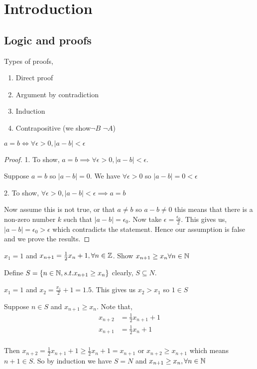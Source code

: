\chapter{Introduction}
\section{Logic and proofs}
Types of proofs,
\begin{enumerate}
    \item Direct proof
    \item Argument by contradiction
    \item Induction
    \item Contrapositive  (we show$\neg B$ \implies $\neg A$)
\end{enumerate}

\begin{theorem}
    $a = b \iff \forall \epsilon > 0, |a - b | < \epsilon$ 
\end{theorem}
\begin{proof}
    1. To show, $a = b \implies \forall \epsilon > 0, |a - b | < \epsilon$.

    Suppose $a = b$ so  $|a - b |= 0$. We have  $\forall \epsilon > 0$ so
    $|a - b | = 0 < \epsilon$
    
    2. To show, $\forall \epsilon > 0, |a - b | < \epsilon \implies a = b$

    Now assume this is not true, or that $a \ne b$ so  $a - b \ne 0$ this means that there is a non-zero number  $k$ such that  $|a - b| = \epsilon_0$. Now take $\epsilon = \frac{\epsilon_0}{2}$. This gives us, 
    $ |a - b | = \epsilon_0 > \epsilon $  which contradicts the statement. Hence our assumption is false and we prove the results.
\end{proof}



\begin{eg}[Induction]
    $x_1 = 1$ and $x_{n + 1} = \frac{1}{2}x_n + 1, \forall n \in \mathbb{Z}$. Show $x_{n + 1} \ge x_n \forall n \in \mathbb{N}$ 


    Define $S = \{n \in \mathbb{N}, s.t. x_{n + 1} \ge x_n\}$ clearly, $S \subseteq N$.


    $x_1 = 1$ and  $x_2 = \frac{x_1}{2} + 1 = 1.5$. This gives us $x_2 > x_1$ so $1 \in S$

    Suppose $n \in S$  and $x_{n + 1} \ge x_n$. Note that,
    \begin{align*}
        x_{n + 2} &= \frac{1}{2}x_{n + 1} + 1\\
        x_{n + 1} &= \frac{1}{2}x_{n} + 1\\
    \end{align*}

    Then $x_{n + 2} = \frac{1}{2}x_{n + 1} + 1 \ge \frac{1}{2} x_n + 1 = x_{n + 1}$ or $x_{n + 2} \ge x_{n + 1}$ which means  $n + 1 \in S$. So by induction we have  $S = N$ and  $x_{n + 1} \ge x_n, \forall n \in \mathbb{N}$
\end{eg}


